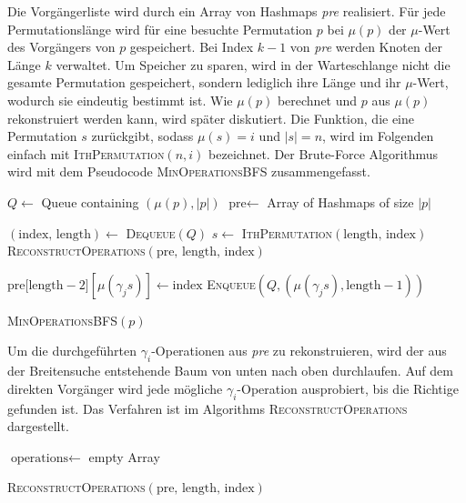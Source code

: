 \documentclass[a4paper, 10pt, ngerman]{article}
\begin{document}
Die Vorgängerliste wird durch ein Array von Hashmaps \emph{pre} realisiert. Für jede Permutationslänge wird für eine besuchte Permutation $p$ bei $\mu(p)$ der $\mu$-Wert des Vorgängers von $p$ gespeichert. Bei Index $k - 1$ von \emph{pre} werden Knoten der Länge $k$ verwaltet. Um Speicher zu sparen, wird in der Warteschlange nicht die gesamte Permutation gespeichert, sondern lediglich ihre Länge und ihr $\mu$-Wert, wodurch sie eindeutig bestimmt ist. Wie $\mu(p)$ berechnet und $p$ aus $\mu(p)$ rekonstruiert werden kann, wird später diskutiert. Die Funktion, die eine Permutation $s$ zurückgibt, sodass $\mu(s) = i$ und $|s| = n$, wird im Folgenden einfach mit \textsc{IthPermutation}$(n, i)$ bezeichnet. Der Brute-Force Algorithmus wird mit dem Pseudocode \textsc{MinOperationsBFS} zusammengefasst.

\begin{algorithm}
    $Q \gets$ Queue containing $(\mu(p), |p|)$ \;
    $\text{pre} \gets$ Array of Hashmaps of size $|p|$ \;

    {
        $(\text{index, length}) \gets $ \textsc{Dequeue}$(Q)$ \;
        $s \gets$ \textsc{IthPermutation}$(\text{length, index})$ \;
        {
            \Return{} \textsc{ReconstructOperations}$(\text{pre, length, index})$ \;
        }

        {
            {
                $\text{pre[length} - 2][\mu(\gamma_j s)] \gets \text{index}$ \;
                \textsc{Enqueue}$(Q, (\mu(\gamma_j s), \text{length} - 1))$ \;
            }
        }
    }

    \caption{\textsc{MinOperationsBFS}$(p)$}
\end{algorithm}

Um die durchgeführten $\gamma_i$-Operationen aus \emph{pre} zu rekonstruieren, wird der aus der Breitensuche entstehende Baum von unten nach oben durchlaufen. Auf dem direkten Vorgänger wird jede mögliche $\gamma_i$-Operation ausprobiert, bis die Richtige gefunden ist. Das Verfahren ist im Algorithms \textsc{ReconstructOperations} dargestellt.

\begin{algorithm}
    $\text{operations} \gets$ empty Array \;

     \;

    \caption{\textsc{ReconstructOperations}$(\text{pre, length, index})$}
\end{algorithm}
\end{document}
